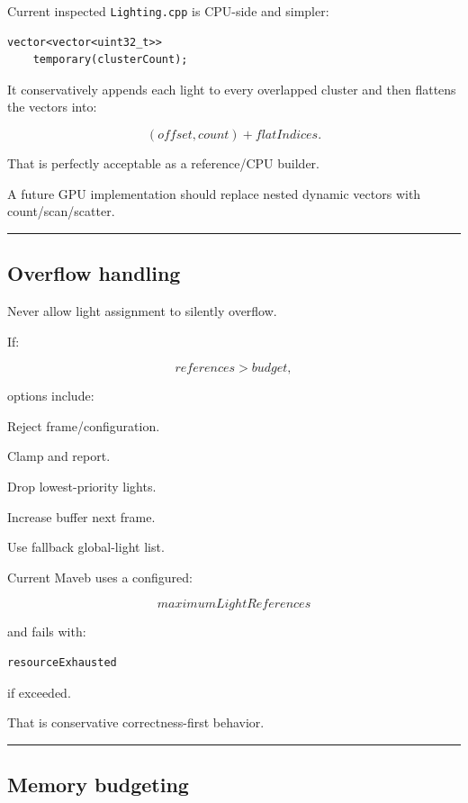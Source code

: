 Current inspected \texttt{Lighting.cpp} is CPU-side and simpler:

\begin{verbatim}
vector<vector<uint32_t>>
    temporary(clusterCount);
\end{verbatim}

It conservatively appends each light to every overlapped cluster and then flattens the vectors into:

\[
(offset,count)
+
flatIndices.
\]

That is perfectly acceptable as a reference/CPU builder.

A future GPU implementation should replace nested dynamic vectors with count/scan/scatter.

\begin{center}\rule{0.5\linewidth}{0.5pt}\end{center}

\subsection{Overflow handling}\label{04-visual-computing-ii-ch040-overflow-handling}

Never allow light assignment to silently overflow.

If:

\[
references>budget,
\]

options include:

Reject frame/configuration.

Clamp and report.

Drop lowest-priority lights.

Increase buffer next frame.

Use fallback global-light list.

Current Maveb uses a configured:

\[
maximumLightReferences
\]

and fails with:

\begin{verbatim}
resourceExhausted
\end{verbatim}

if exceeded.

That is conservative correctness-first behavior.

\begin{center}\rule{0.5\linewidth}{0.5pt}\end{center}

\subsection{Memory budgeting}\label{04-visual-computing-ii-ch040-memory-budgeting}

